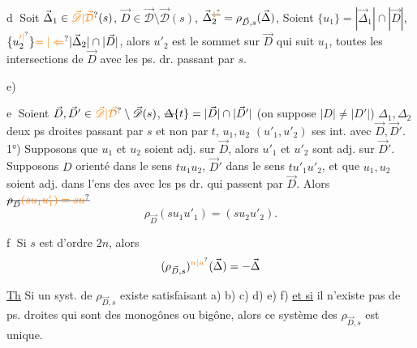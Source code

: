\textcircled{d} Soit $\vec\Delta_1\in\unsure{\vec{\mathscr D}|\vec{\mathcal D}}(s)$, $\vec D\in\vec{\mathscr D}\setminus\vec{\mathscr D}(s)$, $\vec\Delta^{\deleted{\unsure{1}}}_2=\rho_{\vec D,s}(\vec\Delta)$,
Soient $\{u_1\}=|\vec\Delta_1|\cap|\vec D|$, $\{u^{\unsure{\prime|{}}}_2\}\unsure{=|\Leftarrow}|\vec\Delta_2|\cap|\vec D|$, alors $u'_2$ est le
sommet sur $\vec D$ qui suit $u_1$,  toutes les
intersections de $\vec D$ avec les ps. dr. passant par $s$.

e)

\textcircled{e} Soient $\vec D,\vec D'\in\unsure{\vec{\mathscr D}|\vec{\mathcal D}}\setminus\vec{\mathscr D}(s)$,
$\deleted{\Delta}\{t\}=|\vec D|\cap|\vec D'|$ (on suppose
$|D|\ne|D'|$) $\Delta_1,\Delta_2$ deux
ps droites  passant par $s$ et non
par $t$, $u_1,u_2$ $(u'_1,u'_2)$ ses int.
avec $\vec D,\vec D'$. 1°) Supposons que $u_1$ et $u_2$ soient
adj. sur $\vec D$, alors $u'_1$ et $u'_2$ sont adj. sur $\vec D'$. Supposons
$D$ orienté dans le sens $tu_1u_2$, $\vec D'$ dans le sens $tu'_1u'_2$,
et que $u_1,u_2$ soient adj. dans l'ens des  
avec les ps dr. qui passent par $\vec D$. Alors $\deleted{\rho_{\vec D}\unsure{(su_1u'_1)=su}}$
\[
\rho_{\vec D}(su_1u'_1)=(su_2u'_2).
\]

\textcircled{f} Si $s$ est d'ordre $2n$, alors
\[
(\rho_{\vec D,s})^{\unsure{n|u}}(\vec\Delta)=-\vec\Delta
\]

\uline{Th} Si un syst. de $\rho_{\vec D,s}$ existe satisfaisant
a) b) c) d) e) f) \uline{et si} il n'existe pas de ps. droites
qui sont des monogônes ou bigône, alors
ce système des $\rho_{\vec D,s}$ est unique.

